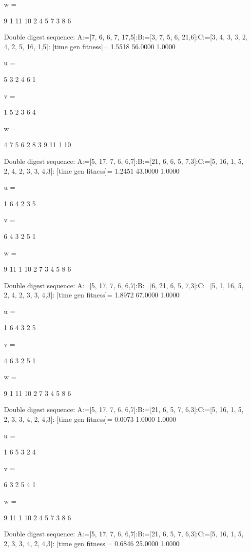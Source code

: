 w =

     9     1    11    10     2     4     5     7     3     8     6

Double digest sequence:
A:=[7, 6, 6, 7, 17,5]:B:=[3, 7, 5, 6, 21,6]:C:=[3, 4, 3, 3, 2, 4, 2, 5, 16, 1,5]:
[time gen fitness]=
    1.5518   56.0000    1.0000


u =

     5     3     2     4     6     1


v =

     1     5     2     3     6     4


w =

     4     7     5     6     2     8     3     9    11     1    10

Double digest sequence:
A:=[5, 17, 7, 6, 6,7]:B:=[21, 6, 6, 5, 7,3]:C:=[5, 16, 1, 5, 2, 4, 2, 3, 3, 4,3]:
[time gen fitness]=
    1.2451   43.0000    1.0000


u =

     1     6     4     2     3     5


v =

     6     4     3     2     5     1


w =

     9    11     1    10     2     7     3     4     5     8     6

Double digest sequence:
A:=[5, 17, 7, 6, 6,7]:B:=[6, 21, 6, 5, 7,3]:C:=[5, 1, 16, 5, 2, 4, 2, 3, 3, 4,3]:
[time gen fitness]=
    1.8972   67.0000    1.0000


u =

     1     6     4     3     2     5


v =

     4     6     3     2     5     1


w =

     9     1    11    10     2     7     3     4     5     8     6

Double digest sequence:
A:=[5, 17, 7, 6, 6,7]:B:=[21, 6, 5, 7, 6,3]:C:=[5, 16, 1, 5, 2, 3, 3, 4, 2, 4,3]:
[time gen fitness]=
    0.0073    1.0000    1.0000


u =

     1     6     5     3     2     4


v =

     6     3     2     5     4     1


w =

     9    11     1    10     2     4     5     7     3     8     6

Double digest sequence:
A:=[5, 17, 7, 6, 6,7]:B:=[21, 6, 5, 7, 6,3]:C:=[5, 16, 1, 5, 2, 3, 3, 4, 2, 4,3]:
[time gen fitness]=
    0.6846   25.0000    1.0000


